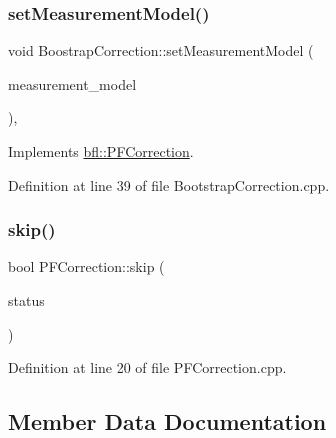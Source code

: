 \subsubsection{\texorpdfstring{set\+Measurement\+Model()}{setMeasurementModel()}}
{\footnotesize\ttfamily void Boostrap\+Correction\+::set\+Measurement\+Model (\begin{DoxyParamCaption}\item[{std\+::unique\+\_\+ptr$<$ \mbox{\hyperlink{classbfl_1_1MeasurementModel}{Measurement\+Model}} $>$}]{measurement\+\_\+model }\end{DoxyParamCaption})\hspace{0.3cm}{\ttfamily [override]}, {\ttfamily [virtual]}}



Implements \mbox{\hyperlink{classbfl_1_1PFCorrection_a9844514568f65a0e5fa2cffadea460c6}{bfl\+::\+P\+F\+Correction}}.



Definition at line 39 of file Bootstrap\+Correction.\+cpp.

\mbox{\label{classbfl_1_1PFCorrection_ab25e625ea12fe257e0eb85d465835e62}} 
\subsubsection{\texorpdfstring{skip()}{skip()}}
{\footnotesize\ttfamily bool P\+F\+Correction\+::skip (\begin{DoxyParamCaption}\item[{const bool}]{status }\end{DoxyParamCaption})\hspace{0.3cm}{\ttfamily [inherited]}}



Definition at line 20 of file P\+F\+Correction.\+cpp.



\subsection{Member Data Documentation}
\mbox{\label{classbfl_1_1BoostrapCorrection_ae35bcabcf28cd7d46f5581c33f1c9390}} 
